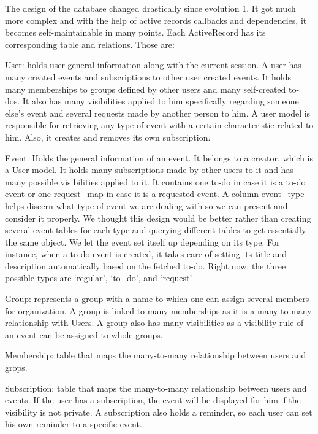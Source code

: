 \documentclass[11pt]{article}
\begin{document}
The design of the database changed drastically since evolution 1. It got much more complex and with the help of active records callbacks and dependencies, it becomes self-maintainable in many points. Each ActiveRecord has its corresponding table and relations. Those are:

\begin{list_type}

  \item User: holds user general information along with the current session. A user has many created events and subscriptions to other user created events. It holds many memberships to groups defined by other users and many self-created to-dos. It also has many visibilities applied to him specifically regarding someone else’s event and several requests made by another person to him. A user model is responsible for retrieving any type of event with a certain characteristic related to him. Also, it creates and removes its own subscription.
  \item Event: Holds the general information of an event. It belongs to a creator, which is a User model. It holds many subscriptions made by other users to it and has many possible visibilities applied to it. It contains one to-do in case it is a to-do event or one request_map in case it is a requested event. A column event_type helps discern what type of event we are dealing with so we can present and consider it properly. We thought this design would be better rather than creating several event tables for each type and querying different tables to get essentially the same object. We let the event set itself up depending on its type. For instance, when a to-do event is created, it takes care of setting its title and description automatically based on the fetched to-do. Right now, the three possible types are ‘regular’, ‘to_do’, and ‘request’.
  \item Group: represents a group with a name to which one can assign several members for organization. A group is linked to many memberships as it is a many-to-many relationship with Users. A group also has many visibilities as a visibility rule of an event can be assigned to whole groups.
  \item Membership: table that maps the many-to-many relationship between users and grops.
  \item Subscription: table that maps the many-to-many relationship between users and events. If the user has a subscription, the event will be displayed for him if the visibility is not private. A subscription also holds a reminder, so each user can set his own reminder to a specific event.

\end{list_type}
\end{document}

